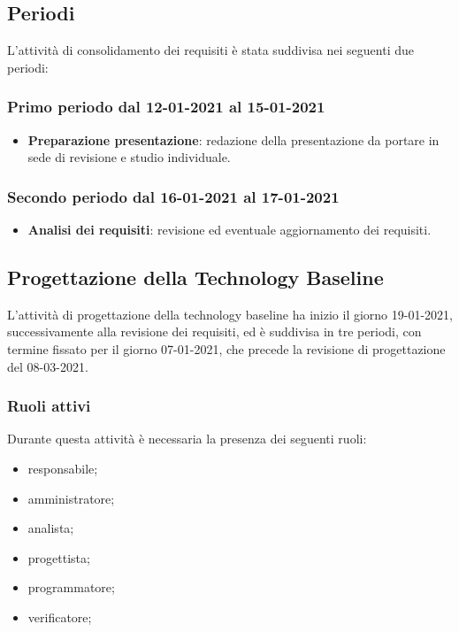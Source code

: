 	\subsection{Periodi}
	L’attività di consolidamento dei requisiti è stata suddivisa nei seguenti due periodi:
	
	\subsubsection{Primo periodo dal 12-01-2021 al 15-01-2021}
	\begin{itemize}
	
	\item \textbf{Preparazione presentazione}: redazione della presentazione da portare in sede di revisione e
	studio individuale.
	
	\end{itemize}	
	
	\subsubsection{Secondo periodo dal 16-01-2021 al 17-01-2021}
	\begin{itemize}
		
	\item \textbf{Analisi dei requisiti}: revisione ed eventuale aggiornamento dei requisiti.
		
	\end{itemize}

	\newpage
	

	\newpage

	
	\subsection{Progettazione della Technology Baseline}
	L’attività di progettazione della technology baseline ha inizio il giorno 19-01-2021, successivamente
	alla revisione dei requisiti, ed è suddivisa in tre periodi, con termine fissato per il giorno 07-01-2021,
	che precede la revisione di progettazione del 08-03-2021.
	
	\subsubsection{Ruoli attivi}
	Durante questa attività è necessaria la presenza dei seguenti ruoli:
	\begin{itemize}
	\item responsabile;
	\item amministratore;
	\item analista;
	\item progettista;
	\item programmatore;
	\item verificatore;
	\end{itemize}

